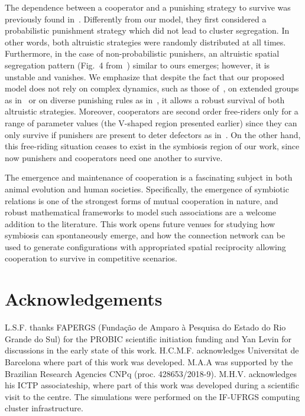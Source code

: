 \documentclass[5p]{elsarticle}
\begin{document}
{The dependence between a cooperator and a punishing strategy to survive was previously found in}~\cite{chen2014probabilistic}. { Differently from our model, they first considered a probabilistic punishment strategy which did not lead to cluster segregation. In other words, both altruistic strategies were randomly distributed at all times.
%
Furthermore, in the case of non-probabilistic punishers, an altruistic spatial segregation pattern (Fig.~4 from}~\cite{chen2014probabilistic}) {similar to ours emerges; however, it is unstable and vanishes. 
%
We emphasize that despite the fact that our proposed model does not rely on complex dynamics, such as those of}~\cite{nakamaru2006}, {on extended groups as in}~\cite{brandt2003punishment} {or on diverse punishing rules as in}~\cite{brandt2003punishment,yang2018promoting,chen2014probabilistic,perc2015double, Szolnoki2017a,nakamaru2006},{ it allows a robust survival of both altruistic strategies. 
%
Moreover,  cooperators are second order free-riders only for a range of parameter values (the V-shaped region presented earlier) since they can only survive if punishers are present to deter defectors as in}~\cite{chen2014probabilistic,Szolnoki2017a,Helbing_2010}. 
%
{On the other hand, this free-riding situation ceases to exist in the symbiosis region of our work,  since now punishers and cooperators need one another to survive. }
% 

The emergence and maintenance of cooperation is a fascinating subject in both animal evolution and human societies. Specifically, the emergence of symbiotic relations is one of the strongest forms of mutual cooperation in nature, and robust mathematical frameworks to model such associations are a welcome addition to the literature. 
%
This work opens future venues for studying how symbiosis can spontaneously emerge, and how the connection network can be used to generate 
{configurations with appropriated spatial reciprocity allowing} cooperation to survive in competitive scenarios.


\section*{Acknowledgements}

L.S.F. thanks  FAPERGS (Fundação de {Am\-pa\-ro} à {Pes\-qui\-sa} do Estado do Rio Grande do Sul) for the PROBIC scientific initiation funding and Yan Levin for discussions in the early state of this work. 
H.C.M.F. acknowledges  Universitat de Barcelona where  part  of  this  work was developed. 
M.A.A  was supported by the Brazilian Research Agencies CNPq (proc. 428653/2018-9).
M.H.V. acknowledges his ICTP associateship, where part of this work was developed during a scientific visit to the centre.
The simulations were performed on the IF-UFRGS computing cluster infrastructure.
\end{document}
